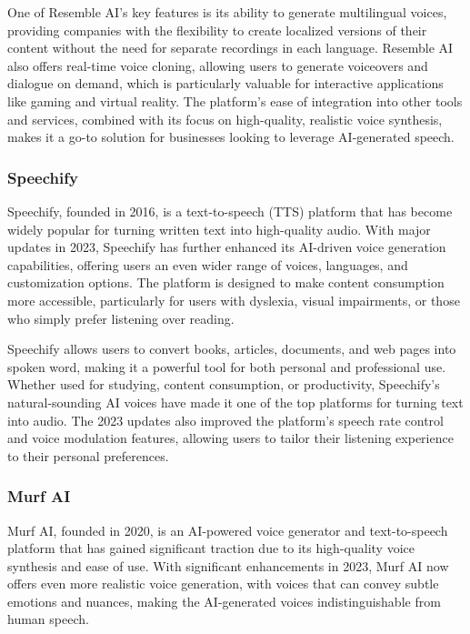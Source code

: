 One of Resemble AI’s key features is its ability to generate multilingual voices, providing companies with the flexibility to create localized versions of their content without the need for separate recordings in each language. 
Resemble AI also offers real-time voice cloning, allowing users to generate voiceovers and dialogue on demand, which is particularly valuable for interactive applications like gaming and virtual reality. 
The platform’s ease of integration into other tools and services, combined with its focus on high-quality, realistic voice synthesis, makes it a go-to solution for businesses looking to leverage AI-generated speech.

\subsubsection{Speechify}

Speechify, founded in 2016, is a text-to-speech (TTS) platform that has become widely popular for turning written text into high-quality audio. 
With major updates in 2023, Speechify has further enhanced its AI-driven voice generation capabilities, offering users an even wider range of voices, languages, and customization options. 
The platform is designed to make content consumption more accessible, particularly for users with dyslexia, visual impairments, or those who simply prefer listening over reading.

Speechify allows users to convert books, articles, documents, and web pages into spoken word, making it a powerful tool for both personal and professional use. 
Whether used for studying, content consumption, or productivity, Speechify’s natural-sounding AI voices have made it one of the top platforms for turning text into audio. 
The 2023 updates also improved the platform’s speech rate control and voice modulation features, allowing users to tailor their listening experience to their personal preferences.

\subsubsection{Murf AI}

Murf AI, founded in 2020, is an AI-powered voice generator and text-to-speech platform that has gained significant traction due to its high-quality voice synthesis and ease of use. 
With significant enhancements in 2023, Murf AI now offers even more realistic voice generation, with voices that can convey subtle emotions and nuances, making the AI-generated voices indistinguishable from human speech.

